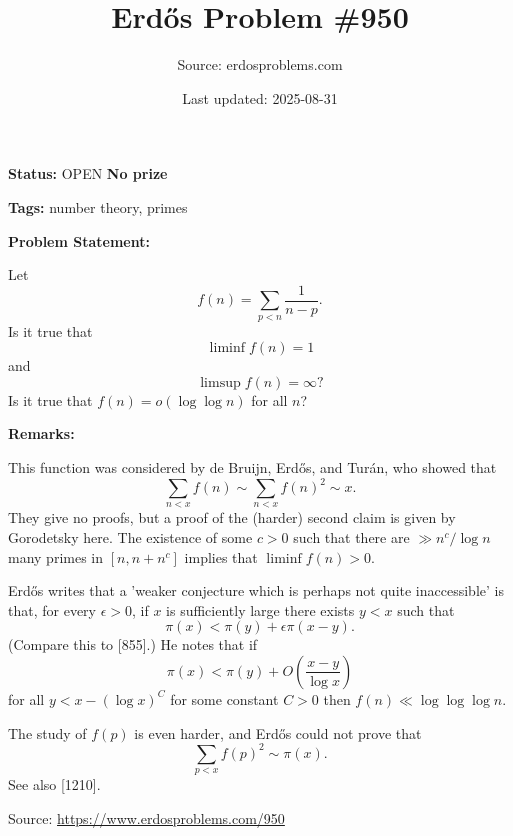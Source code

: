 \documentclass{article}
\title{Erd\H{o}s Problem \#950}
\date{Last updated: 2025-08-31}
\author{Source: erdosproblems.com}
\begin{document}
\maketitle

\noindent\textbf{Status:} OPEN \quad \textbf{No prize}

\noindent\textbf{Tags:} number theory, primes

\medskip
\noindent\textbf{Problem Statement:}

Let\[f(n) = \sum_{p<n}\frac{1}{n-p}.\]Is it true that\[\liminf f(n)=1\]and\[\limsup f(n)=\infty?\]Is it true that $f(n)=o(\log\log n)$ for all $n$?

\bigskip
\noindent\textbf{Remarks:}

This function was considered by de Bruijn, Erd\H{o}s, and Tur\'{a}n, who showed that\[\sum_{n<x}f(n)\sim \sum_{n<x}f(n)^2\sim x.\]They give no proofs, but a proof of the (harder) second claim is given by Gorodetsky here. The existence of some $c>0$ such that there are $\gg n^c/\log n$ many primes in $[n,n+n^c]$ implies that $\liminf f(n)>0$. 

Erd\H{o}s writes that a 'weaker conjecture which is perhaps not quite inaccessible' is that, for every $\epsilon>0$, if $x$ is sufficiently large there exists $y<x$ such that\[\pi(x)< \pi(y)+\epsilon \pi(x-y).\](Compare this to [855].) He notes that if\[\pi(x)< \pi(y)+O\left(\frac{x-y}{\log x}\right)\]for all $y<x-(\log x)^C$ for some constant $C>0$ then $f(n)\ll \log\log\log n$.

The study of $f(p)$ is even harder, and Erd\H{o}s could not prove that\[\sum_{p<x}f(p)^2\sim \pi(x).\]See also [1210].

\bigskip
\noindent\small{Source: \url{https://www.erdosproblems.com/950}}
\end{document}
